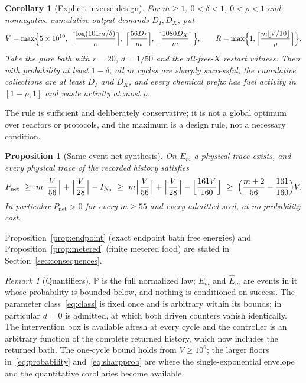 \documentclass[11pt,a4paper]{article}
\theoremstyle{plain}
\newtheorem{proposition}[theorem]{Proposition}
\newtheorem{corollary}[theorem]{Corollary}
\theoremstyle{definition}
\theoremstyle{remark}
\newtheorem{remark}[theorem]{Remark}
\newcommand{\Prob}{\mathbb P}
\newcommand{\Iv}{I}
\newcommand{\Pnet}{P_{\mathrm{net}}}
\begin{document}
\begin{corollary}[Explicit inverse design]\label{cor:design}
For $m\ge1$, $0<\delta<1$, $0<\rho<1$ and nonnegative cumulative output demands $D_I,D_X$, put
\begin{equation}\label{eq:design}
V=\max\Bigl\{5\times10^{10},\ \Bigl\lceil\frac{\log(101m/\delta)}{\kappa}\Bigr\rceil,\ \Bigl\lceil\frac{56D_I}m\Bigr\rceil,\ \Bigl\lceil\frac{1080D_X}m\Bigr\rceil\Bigr\},\qquad
R=\max\Bigl\{1,\Bigl\lceil\frac{m\lfloor V/10\rfloor}\rho\Bigr\rceil\Bigr\}.
\end{equation}
Take the pure bath with $r=20$, $d=1/50$ and the all-free-$X$ restart witness. Then with probability at least $1-\delta$, all $m$ cycles are sharply successful, the cumulative collections are at least $D_I$ and $D_X$, and every chemical prefix has fuel activity in $[1-\rho,1]$ and waste activity at most $\rho$.
\end{corollary}
The rule is sufficient and deliberately conservative; it is not a global optimum over reactors or protocols, and the maximum is a design rule, not a necessary condition.

\begin{proposition}[Same-event net synthesis]\label{prop:synthesis}
On $E_m$ a physical trace exists, and every physical trace of the recorded history satisfies
\begin{equation}\label{eq:synthesis}
\Pnet\ \ge\ m\Bigl\lceil\frac V{56}\Bigr\rceil+\Bigl\lceil\frac V{28}\Bigr\rceil-\Iv_{N_0}
\ \ge\ m\Bigl\lceil\frac V{56}\Bigr\rceil+\Bigl\lceil\frac V{28}\Bigr\rceil-\Bigl\lfloor\frac{161V}{160}\Bigr\rfloor
\ \ge\ \Bigl(\frac{m+2}{56}-\frac{161}{160}\Bigr)V .
\end{equation}
In particular $\Pnet>0$ for every $m\ge55$ and every admitted seed, at no probability cost.
\end{proposition}

Proposition~\ref{prop:endpoint} (exact endpoint bath free energies) and Proposition~\ref{prop:metered} (finite metered food) are stated in Section~\ref{sec:consequences}.

\begin{remark}[Quantifiers]\label{rem:quantifiers}
$\Prob$ is the full normalized law; $E_m$ and $\widehat E_m$ are events in it whose probability is bounded below, and nothing is conditioned on success. The parameter class~\eqref{eq:class} is fixed once and is arbitrary within its bounds; in particular $d=0$ is admitted, at which both driven counters vanish identically. The intervention box is available afresh at every cycle and the controller is an arbitrary function of the complete returned history, which now includes the returned bath. The one-cycle bound holds from $V\ge10^6$; the larger floors in~\eqref{eq:probability} and~\eqref{eq:sharpprob} are where the single-exponential envelope and the quantitative corollaries become available.
\end{remark}
\end{document}

